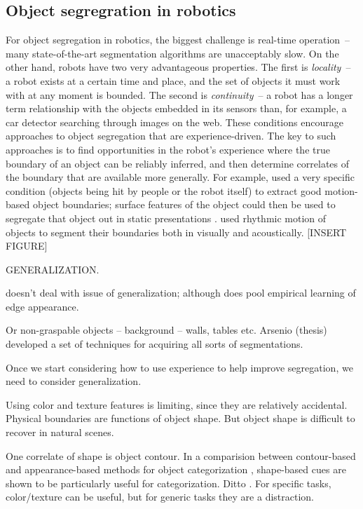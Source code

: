 \subsection{Object segregration in robotics}

For object segregation in robotics, the biggest challenge is real-time
operation~-- many state-of-the-art segmentation algorithms are
unacceptably slow.  On the other hand, robots have two very
advantageous properties.  
%
The first is
{\em locality}~-- a robot exists at a certain time and place, and the
set of objects it must work with at any moment is bounded.  
%
The second is
{\em continuity}~-- a robot has a longer term relationship with
the objects embedded in its sensors than, for example, a car 
detector searching through images on the web.
%
These conditions encourage approaches to object segregation
that are experience-driven.
%
The key to such approaches is to find
opportunities in the robot's experience where the
true boundary of an object can be reliably inferred,
and then determine correlates of the boundary that 
are available more generally.
%
For example,  used
a very specific condition (objects being hit by
people or the robot itself) to extract good
motion-based object boundaries; surface features
of the object could then be used to segregate that
object out in static presentations \cite{fitzpatrick03object}.
 used rhythmic motion
of objects to segment their boundaries both in
visually and acoustically.
%
[INSERT FIGURE]


GENERALIZATION.

doesn't deal with issue of generalization; although
does pool empirical learning of edge appearance.

Or non-graspable objects -- background -- walls, tables etc.
Arsenio (thesis) developed a set of techniques for acquiring
all sorts of segmentations.


Once we start considering how to use experience to help
improve segregation, we need to consider generalization.

Using color and texture features is limiting, since they
are relatively accidental.  Physical boundaries are functions
of object shape.  But object shape is difficult to recover in
natural scenes.

One correlate of shape is object contour.  In a comparision between
contour-based and appearance-based methods for object categorization
\cite{leibe03analyzing}, shape-based cues are shown to be
particularly useful for categorization.
Ditto \cite{lecun04learning}.
For specific tasks, color/texture can be useful, but for 
generic tasks they are a distraction.

